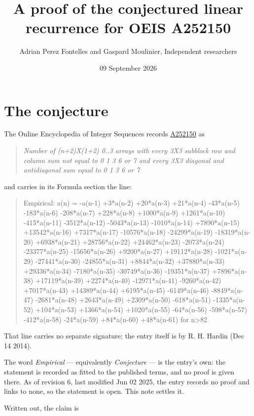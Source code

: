 \documentclass[11pt]{article}
\title{A proof of the conjectured linear recurrence for OEIS A252150}
\author{Adrian Perez Fontelles and Gaspard Moulinier, Independent researchers}
\date{09 September 2026}
\theoremstyle{definition}
\begin{document}
\maketitle
\section{The conjecture}

The Online Encyclopedia of Integer Sequences records \href{https://oeis.org/A252150}{A252150} as

\begin{quote}\itshape Number of (n+2)X(1+2) 0..3 arrays with every 3X3 subblock row and column sum not equal to 0 1 3 6 or 7 and every 3X3 diagonal and antidiagonal sum equal to 0 1 3 6 or 7\end{quote}

and carries in its Formula section the line:

\begin{quote}\ttfamily Empirical: a(n) = -a(n-1) +3*a(n-2) +20*a(n-3) +21*a(n-4) -43*a(n-5) -183*a(n-6) -208*a(n-7) +228*a(n-8) +1000*a(n-9) +1261*a(n-10) -415*a(n-11) -3512*a(n-12) -5043*a(n-13) -1010*a(n-14) +7890*a(n-15) +13542*a(n-16) +7317*a(n-17) -10576*a(n-18) -24299*a(n-19) -18319*a(n-20) +6938*a(n-21) +28756*a(n-22) +24462*a(n-23) -2073*a(n-24) -23377*a(n-25) -15656*a(n-26) +9200*a(n-27) +19112*a(n-28) -1021*a(n-29) -27441*a(n-30) -24855*a(n-31) +8844*a(n-32) +37880*a(n-33) +29336*a(n-34) -7180*a(n-35) -30749*a(n-36) -19351*a(n-37) +7896*a(n-38) +17119*a(n-39) +2274*a(n-40) -12971*a(n-41) -9260*a(n-42) +7017*a(n-43) +14389*a(n-44) +6195*a(n-45) -6149*a(n-46) -8849*a(n-47) -2681*a(n-48) +2643*a(n-49) +2309*a(n-50) -618*a(n-51) -1335*a(n-52) +104*a(n-53) +1366*a(n-54) +1020*a(n-55) -64*a(n-56) -598*a(n-57) -412*a(n-58) -24*a(n-59) +84*a(n-60) +48*a(n-61) for n>82\end{quote}

That line carries no separate signature; the entry itself is by R. H. Hardin (Dec 14 2014).

The word {\itshape Empirical} --- equivalently {\itshape Conjecture} --- is the entry's own: the statement is recorded as fitted to the published terms, and no proof is given there. As of revision 6, last modified Jun 02 2025, the entry records no proof and links to none, so the statement is open. This note settles it.

Written out, the claim is
\end{document}
